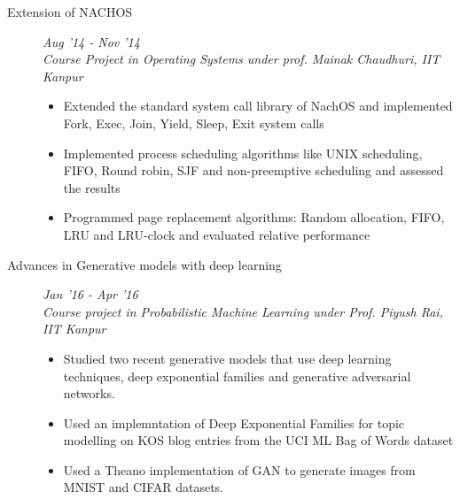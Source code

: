 \documentclass[9pt]{article}
\newenvironment{changemargin}[2]{%
  \begin{list}{}{%
    \setlength{\topsep}{0pt}%
    \setlength{\leftmargin}{#1}%
    \setlength{\rightmargin}{#2}%
    \setlength{\listparindent}{\parindent}%
    \setlength{\itemindent}{\parindent}%
    \setlength{\parsep}{\parskip}%
  }%
  \item[]}{\end{list}
}
\newenvironment{body} {
	\vspace*{-16pt}
	\begin{changemargin}{-0.6in}{-0.65in}
  }	
	{\end{changemargin}
}
\begin{document}
\begin{body}
\begin{description}
% 	
	\item[\normalsize{Extension of NACHOS}]  \hfill \textit{Aug '14 - Nov '14} \\
	\textit{Course Project in Operating Systems under prof. Mainak Chaudhuri, IIT Kanpur}
	\begin{itemize}
	 \item Extended the standard system call library of NachOS and implemented Fork, Exec, Join, Yield, Sleep, Exit system calls
	 \item Implemented process scheduling algorithms like UNIX scheduling, FIFO, Round robin, SJF and non-preemptive scheduling and assessed the results
	 \item Programmed page replacement algorithms: Random allocation, FIFO, LRU and LRU-clock and evaluated relative performance
	\end{itemize}
	
	 \item[\normalsize{Advances in Generative models with deep learning}] \hfill  \textit{Jan '16 - Apr '16} \\
	  \textit{Course project in Probabilistic Machine Learning under Prof. Piyush Rai, IIT Kanpur}
	  \begin{itemize}
            \item Studied two recent generative models that use deep learning techniques, deep exponential families
                  and generative adversarial networks.  
            \item Used an implemntation of Deep Exponential Families for topic modelling on KOS blog entries from the
                  UCI ML Bag of Words dataset
            \item Used a Theano implementation of GAN to generate images from MNIST and CIFAR datasets.
	  \end{itemize}


\end{description}
\end{body}
\end{document}
